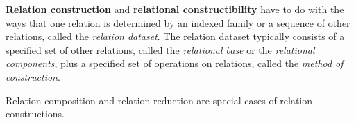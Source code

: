 \documentclass[12pt]{article}
\begin{document}

\textbf{Relation construction} and \textbf{relational constructibility} have to do with the ways that one relation is determined by an indexed family or a sequence of other relations, called the \textit{relation dataset}.  The relation dataset typically consists of a specified set of other relations, called the \textit{relational base} or the \textit{relational components}, plus a specified set of operations on relations, called the \textit{method of construction}. 

Relation composition and relation reduction are special cases of relation constructions.

\end{document}
